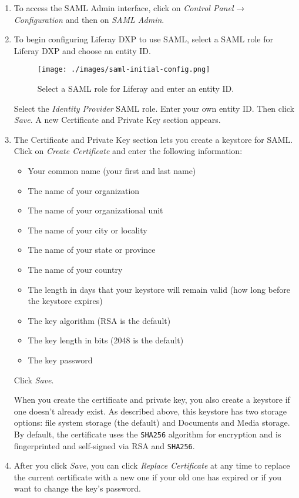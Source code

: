 \begin{enumerate}
\def\labelenumi{\arabic{enumi}.}
\item
  To access the SAML Admin interface, click on \emph{Control Panel} →
  \emph{Configuration} and then on \emph{SAML Admin}.
\item
  To begin configuring Liferay DXP to use SAML, select a SAML role for
  Liferay DXP and choose an entity ID.

  \begin{figure}
  \centering
  \texttt{[image: ./images/saml-initial-config.png]}
  \caption{Select a SAML role for Liferay and enter an entity ID.}
  \end{figure}

  Select the \emph{Identity Provider} SAML role. Enter your own entity
  ID. Then click \emph{Save}. A new Certificate and Private Key section
  appears.
\item
  The Certificate and Private Key section lets you create a keystore for
  SAML. Click on \emph{Create Certificate} and enter the following
  information:

  \begin{itemize}
  \tightlist
  \item
    Your common name (your first and last name)
  \item
    The name of your organization
  \item
    The name of your organizational unit
  \item
    The name of your city or locality
  \item
    The name of your state or province
  \item
    The name of your country
  \item
    The length in days that your keystore will remain valid (how long
    before the keystore expires)
  \item
    The key algorithm (RSA is the default)
  \item
    The key length in bits (2048 is the default)
  \item
    The key password
  \end{itemize}

  Click \emph{Save}.

  When you create the certificate and private key, you also create a
  keystore if one doesn't already exist. As described above, this
  keystore has two storage options: file system storage (the default)
  and Documents and Media storage. By default, the certificate uses the
  \texttt{SHA256} algorithm for encryption and is fingerprinted and
  self-signed via RSA and \texttt{SHA256}.
\item
  After you click \emph{Save}, you can click \emph{Replace Certificate}
  at any time to replace the current certificate with a new one if your
  old one has expired or if you want to change the key's password.


\end{enumerate}
